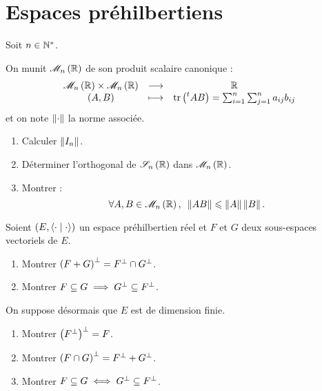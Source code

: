 \chapter{Espaces préhilbertiens}

\minitoc

\begin{exo}[Exercice 1]
Soit \(n\in\mathbb{N}^*\).

On munit \(\M{n}[\R]\) de son produit scalaire canonique : \[\fonctionlambda{\M{n}[\R]\times\M{n}[\R]}{\R}{\paren{A,B}}{\tr\paren{\trans{A}B}=\sum_{i=1}^n\sum_{j=1}^na_{ij}b_{ij}}\] et on note \(\left\|\cdot\right\|\) la norme associée.

\begin{enumerate}
\item Calculer \(\left\|I_n\right\|\). \\

\item Déterminer l'orthogonal de \(\sym{n}[\R]\) dans \(\M{n}[\R]\). \\

\item Montrer : \[\quantifs{\forall A,B\in\M{n}[\R]}\norme{AB}\leq\norme{A}\norme{B}.\]
\end{enumerate}
\end{exo}

\begin{corr}
\end{corr}

\begin{exo}[Exercice 2]
Soient \(\groupe{E}[\ps{\cdot}{\cdot}]\) un espace préhilbertien réel et \(F\) et \(G\) deux sous-espaces vectoriels de \(E\).

\begin{enumerate}[series=exoOrthos]
\item Montrer \(\left(F+G\right)^{\perp}=F^{\perp}\cap G^{\perp}\). \\

\item Montrer \(F\subseteq G\implies G^{\perp}\subseteq F^{\perp}\).
\end{enumerate}

On suppose désormais que \(E\) est de dimension finie.

\begin{enumerate}[resume=exoOrthos]
\item Montrer \(\left(F^{\perp}\right)^{\perp}=F\). \\

\item Montrer \(\left(F\cap G\right)^{\perp}=F^{\perp}+G^{\perp}\). \\

\item Montrer \(F\subseteq G\iff G^{\perp}\subseteq F^{\perp}\).
\end{enumerate}
\end{exo}

